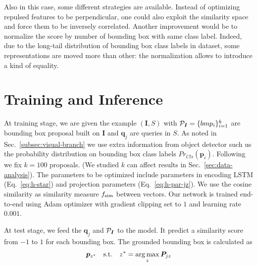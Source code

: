 Also in this case, some different strategies are available. Instead of
optimizing repulsed features to be perpendicular, one could also
exploit the similarity space and force them to be inversely
correlated. Another improvement would be to normalize the score by
number of bounding box with same class label. Indeed, due to the
long-tail distribution of bounding box class labels in dataset, some
representations are moved more than other: the normalization allows to
introduce a kind of equality.

\section{Training and Inference}

At training stage, we are given the example $(\bm{I}, S)$ with
$\mathcal{P}_{\bm{I}} = \{ bm{p}_i \}^k_{i=1}$ are bounding box proposal
built on $\bm{I}$ and $\bm{q}_j$ are queries in $S$. As noted in
Sec.~\ref{subsec:visual-branch} we use extra information from object
detector such us the probability distribution on bounding box class
labels $Pr_{Cls}(\bm{p}_i)$. Following \cite{chen2018knowledge} we fix
$k = 100$ proposals. (We studied $k$ can affect results in
Sec.~\ref{sec:data-analysis}). The parameters to be optimized include
parameters in encoding LSTM (Eq.~\ref{eq:h-star}) and projection
parameters (Eq.~\ref{eq:h-par-jz}). We use the cosine similarity as
similarity measure $f_{\text{sim}}$ between vectors. Our network is trained
end-to-end using Adam optimizer with gradient clipping set to $1$ and
learning rate $0.001$.

At test stage, we feed the $\bm{q}_j$ and $\mathcal{P}_{\bm{I}}$ to the model. It predict a similarity score from $-1$ to $1$ for each bounding box. The grounded bounding box is calculated as
\begin{equation}
  \bm{p}_{z^*} \quad \text{s.t.} \quad z^* = \operatorname*{arg\,max}_z \bm{P}_{jz}
\end{equation}
